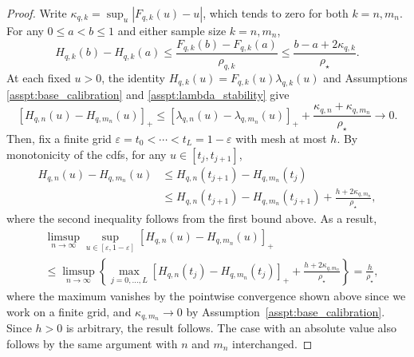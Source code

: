 \documentclass[10pt]{article}
\begin{document}
\begin{proof}
Write $\kappa_{q,k}=\sup_u|F_{q,k}(u)-u|$, which tends to zero
for both $k=n,m_n$. For any $0\le a<b\le1$ and either sample size $k=n, m_n$,
\[
H_{q,k}(b)-H_{q,k}(a)
\le \frac{F_{q,k}(b)-F_{q,k}(a)}{\rho_{q,k}}
\le \frac{b-a+2\kappa_{q,k}}{\rho_\star}.
\]
At each fixed $u>0$, the identity $H_{q,k}(u)=F_{q,k}(u)\lambda_{q,k}(u)$ and
Assumptions \ref{asspt:base_calibration} and \ref{asspt:lambda_stability} give
\[
[H_{q,n}(u)-H_{q,m_n}(u)]_+
\le [\lambda_{q,n}(u)-\lambda_{q,m_n}(u)]_+
+\frac{\kappa_{q,n}+\kappa_{q,m_n}}{\rho_\star}
\longrightarrow0.
\]
Then, fix a finite grid $\varepsilon=t_0<\cdots<t_L=1-\varepsilon$
with mesh at most $h$. By monotonicity of the cdfs,
for any $u\in[t_j,t_{j+1}]$,
\begin{equation} \label{eq:pointwise_H_q}
\begin{aligned}
H_{q,n}(u)-H_{q,m_n}(u)
&\le H_{q,n}(t_{j+1})-H_{q,m_n}(t_j)\\
&\le H_{q,n}(t_{j+1})-H_{q,m_n}(t_{j+1})
+\frac{h+2\kappa_{q,m_n}}{\rho_\star},
\end{aligned}
\end{equation}
where the second inequality follows from the first bound above. As a result,
\[
\begin{aligned}
&\limsup_{n \to \infty} \sup_{u\in[\varepsilon,1-\varepsilon]}
[H_{q,n}(u)-H_{q,m_n}(u)]_+\\
&\le
\limsup_{n \to \infty} \left\{ \max_{j=0,\ldots,L}
[H_{q,n}(t_j)-H_{q,m_n}(t_j)]_+
+\frac{h+2\kappa_{q,m_n}}{\rho_\star} \right\} = \frac{h}{\rho_\star} ,
\end{aligned}
\]
where the maximum vanishes by the pointwise convergence shown above since we work on a finite grid, and $\kappa_{q,m_n}\to0$ by Assumption~\ref{asspt:base_calibration}.
Since $h>0$ is arbitrary, the result follows. The case with an absolute value also follows by the same argument with $n$ and $m_n$ interchanged.
\end{proof}
\end{document}
